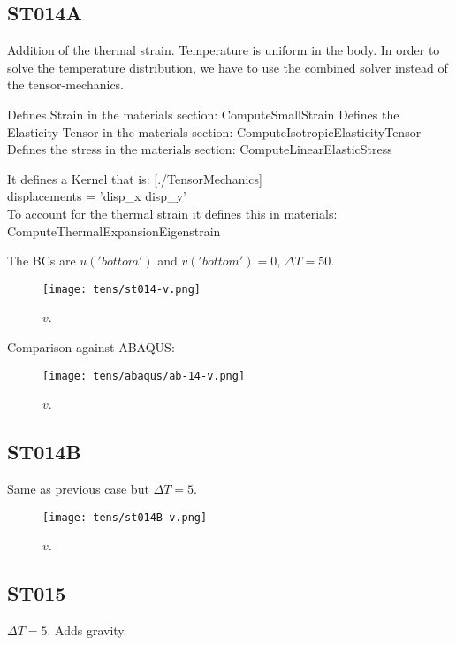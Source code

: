 \documentclass[11pt,letterpaper]{article}
\begin{document}
\subsection{ST014A}

Addition of the thermal strain. Temperature is uniform in the body.
In order to solve the temperature distribution, we have to use the combined solver instead of the tensor-mechanics.

Defines Strain in the materials section: ComputeSmallStrain
Defines the Elasticity Tensor in the materials section: ComputeIsotropicElasticityTensor
Defines the stress in the materials section: ComputeLinearElasticStress

It defines a Kernel that is:
[./TensorMechanics]\\
displacements = 'disp\_x disp\_y'\\

To account for the thermal strain it defines this in materials: ComputeThermalExpansionEigenstrain

The BCs are $u('bottom')$ and $v('bottom') = 0$, $\Delta T=50$.

\begin{figure}[H]
	\centering
	\texttt{[image: tens/st014-v.png]}
	\hfill
	\caption{$v$.}
	\label{fig:st14}
\end{figure}

Comparison against ABAQUS:

\begin{figure}[H]
	\centering
	\texttt{[image: tens/abaqus/ab-14-v.png]}
	\hfill
	\caption{$v$.}
	\label{fig:st14ab}
\end{figure}

\subsection{ST014B}

Same as previous case but $\Delta T=5$.

\begin{figure}[H]
	\centering
	\texttt{[image: tens/st014B-v.png]}
	\hfill
	\caption{$v$.}
	\label{fig:st14B}
\end{figure}

\subsection{ST015}

$\Delta T=5$. Adds gravity.
\end{document}
